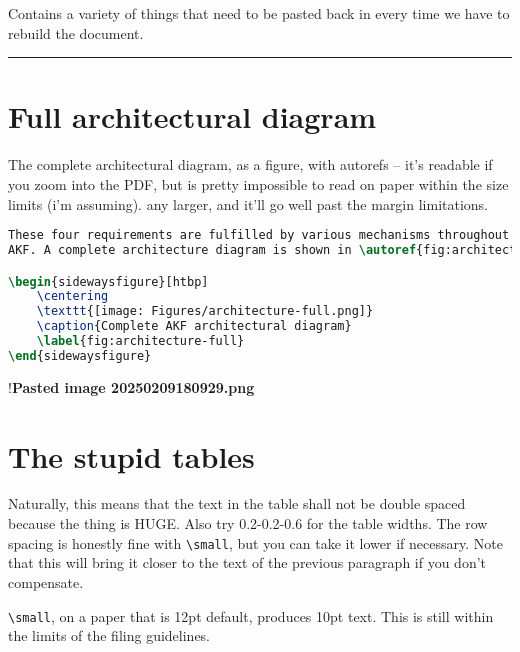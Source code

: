 Contains a variety of things that need to be pasted back in every time
we have to rebuild the document.

\begin{center}\rule{0.5\linewidth}{0.5pt}\end{center}

\section{Full architectural diagram}\label{full-architectural-diagram}

The complete architectural diagram, as a figure, with autorefs -- it's
readable if you zoom into the PDF, but is pretty impossible to read on
paper within the size limits (i'm assuming). any larger, and it'll go
well past the margin limitations.

\begin{lstlisting}[language=TeX]
These four requirements are fulfilled by various mechanisms throughout
AKF. A complete architecture diagram is shown in \autoref{fig:architecture-full}. 

\begin{sidewaysfigure}[htbp]
    \centering
    \texttt{[image: Figures/architecture-full.png]}
    \caption{Complete AKF architectural diagram}
    \label{fig:architecture-full}
\end{sidewaysfigure} 
\end{lstlisting}

!\textbf{Pasted image 20250209180929.png}

\section{The stupid tables}\label{the-stupid-tables}

Naturally, this means that the text in the table shall not be double
spaced because the thing is HUGE. Also try 0.2-0.2-0.6 for the table
widths. The row spacing is honestly fine with
\passthrough{\lstinline!\\small!}, but you can take it lower if
necessary. Note that this will bring it closer to the text of the
previous paragraph if you don't compensate.

\passthrough{\lstinline!\\small!}, on a paper that is 12pt default,
produces 10pt text. This is still within the limits of the filing
guidelines.

